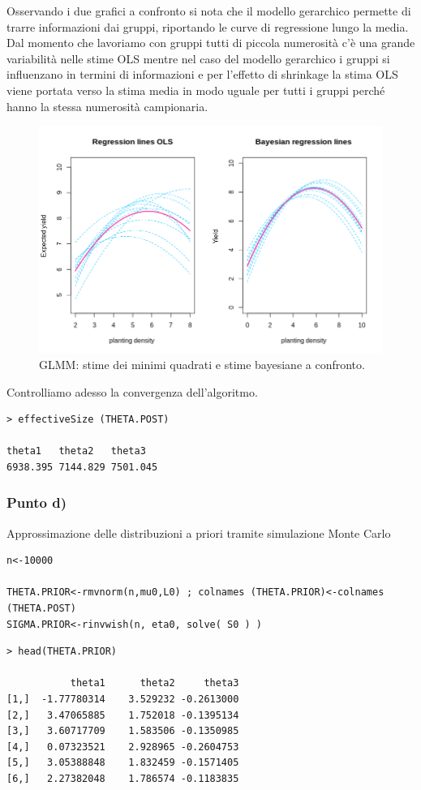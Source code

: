 Osservando i due grafici a confronto si nota che il modello gerarchico permette 
di trarre informazioni dai gruppi, 
riportando le curve di regressione lungo la media. 
Dal momento che lavoriamo con gruppi tutti di piccola numerosità c'è una grande 
variabilità nelle stime OLS mentre nel caso del modello gerarchico i gruppi si 
influenzano in termini di informazioni e per l'effetto di shrinkage la stima OLS 
viene portata verso la stima media in modo uguale per tutti i gruppi perché hanno 
la stessa numerosità campionaria.
\begin{figure}
    \centering
    \includegraphics[totalheight=8cm]{img/esercizio11-2-2.png}
    \caption{ GLMM: stime dei minimi quadrati e stime bayesiane a confronto.}
\end{figure}
\newpage
Controlliamo adesso la convergenza dell'algoritmo.
{
\color{red}
\begin{Verbatim}
> effectiveSize (THETA.POST)

theta1   theta2   theta3  
6938.395 7144.829 7501.045 
\end{Verbatim}
}

\subsubsection*{Punto d)}
Approssimazione delle distribuzioni a priori tramite simulazione Monte Carlo
\begin{lstlisting}[style=R]
n<-10000

THETA.PRIOR<-rmvnorm(n,mu0,L0) ; colnames (THETA.PRIOR)<-colnames (THETA.POST)
SIGMA.PRIOR<-rinvwish(n, eta0, solve( S0 ) )
\end{lstlisting}

\newpage
{
\color{red}
\begin{Verbatim}
> head(THETA.PRIOR)

           theta1      theta2     theta3
[1,]  -1.77780314    3.529232 -0.2613000
[2,]   3.47065885    1.752018 -0.1395134
[3,]   3.60717709    1.583506 -0.1350985
[4,]   0.07323521    2.928965 -0.2604753
[5,]   3.05388848    1.832459 -0.1571405
[6,]   2.27382048    1.786574 -0.1183835
\end{Verbatim}
}

